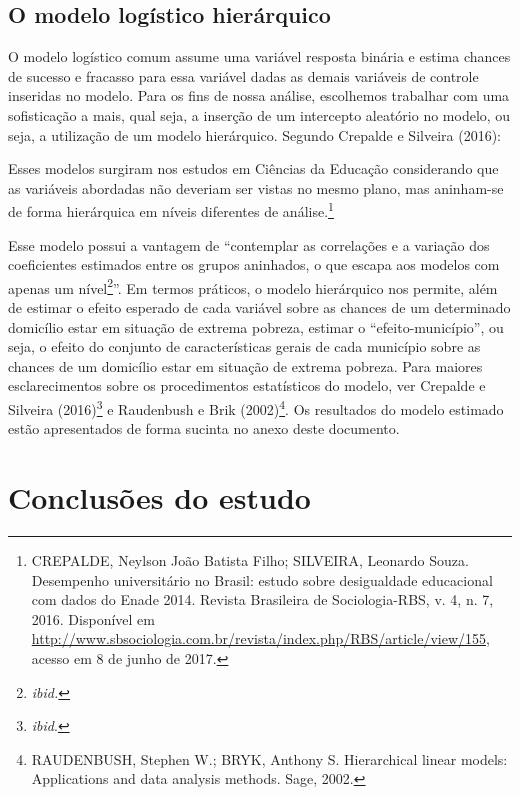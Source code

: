 \documentclass[a4paper, 12pt, openright, oneside, english, brazil, article]{abntex2}
\begin{document}
	\subsection{O modelo logístico hierárquico}
	
	O modelo logístico comum assume uma variável resposta binária e estima chances de sucesso e fracasso para essa variável dadas as demais variáveis de controle inseridas no modelo. Para os fins de nossa análise, escolhemos trabalhar com uma sofisticação a mais, qual seja, a inserção de um intercepto aleatório no modelo, ou seja, a utilização de um modelo hierárquico. Segundo Crepalde e Silveira (2016):
	
	\begin{citacao}
	Esses modelos surgiram nos estudos em Ciências da Educação considerando que as variáveis abordadas não deveriam ser vistas no mesmo plano, mas aninham-se de forma hierárquica em níveis diferentes de análise.\footnote{CREPALDE, Neylson João Batista Filho; SILVEIRA, Leonardo Souza. Desempenho universitário no Brasil: estudo sobre desigualdade educacional com dados do Enade 2014. Revista Brasileira de Sociologia-RBS, v. 4, n. 7, 2016. Disponível em \url{http://www.sbsociologia.com.br/revista/index.php/RBS/article/view/155}, acesso em 8 de junho de 2017.}		
	\end{citacao}
	
	Esse modelo possui a vantagem de ``contemplar as correlações e a variação dos coeficientes estimados entre os grupos aninhados, o que escapa aos modelos com apenas um nível\footnote{\textit{ibid.}}''. Em termos práticos, o modelo hierárquico nos permite, além de estimar o efeito esperado de cada variável sobre as chances de um determinado domicílio estar em situação de extrema pobreza, estimar o ``efeito-município'', ou seja, o efeito do conjunto de características gerais de cada município sobre as chances de um domicílio estar em situação de extrema pobreza. Para maiores esclarecimentos sobre os procedimentos estatísticos do modelo, ver Crepalde e Silveira (2016)\footnote{\textit{ibid}.} e Raudenbush e Brik (2002)\footnote{RAUDENBUSH, Stephen W.; BRYK, Anthony S. Hierarchical linear models: Applications and data analysis methods. Sage, 2002.}. Os resultados do modelo estimado estão apresentados de forma sucinta no anexo deste documento.

	\section{Conclusões do estudo}
	
\end{document}
